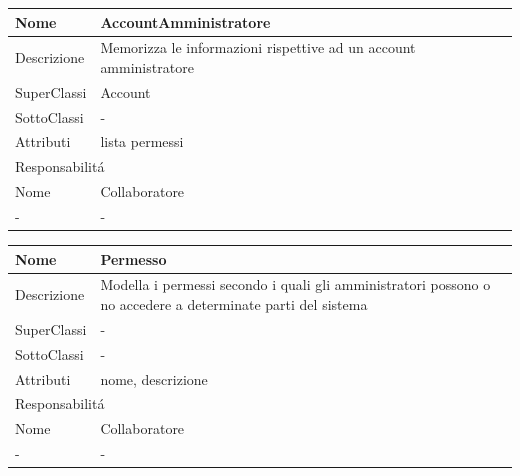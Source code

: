\begin{center} %
    \begin{longtable}{ |p{3cm}|p{3cm}|p{3cm}|p{3cm}| }
        \hline
        Nome & \multicolumn{3}{|p{9cm}|}{AccountAmministratore} \\\hline
        Descrizione & \multicolumn{3}{|p{9cm}|}{Memorizza le informazioni rispettive ad un account amministratore} \\\hline
        SuperClassi & \multicolumn{3}{|p{9cm}|}{Account} \\\hline
        SottoClassi & \multicolumn{3}{|p{9cm}|}{-} \\\hline
        Attributi & \multicolumn{3}{|p{9cm}|}{lista permessi} \\\hline
        \multicolumn{4}{|p{12cm}|}{Responsabilit\'a} \\\hline %
        \multicolumn{2}{|p{6cm}|}{Nome} & \multicolumn{2}{|p{6cm}|}{Collaboratore} \\\hline %
        \multicolumn{2}{|p{6cm}|}{-} & \multicolumn{2}{|p{6cm}|}{-} \\\hline
    \end{longtable}
\end{center}

\begin{center} %
    \begin{longtable}{ |p{3cm}|p{3cm}|p{3cm}|p{3cm}| }
        \hline
        Nome & \multicolumn{3}{|p{9cm}|}{Permesso} \\\hline
        Descrizione & \multicolumn{3}{|p{9cm}|}{Modella i permessi secondo i quali gli amministratori possono o no accedere a determinate parti del sistema} \\\hline
        SuperClassi & \multicolumn{3}{|p{9cm}|}{-} \\\hline
        SottoClassi & \multicolumn{3}{|p{9cm}|}{-} \\\hline
        Attributi & \multicolumn{3}{|p{9cm}|}{nome, descrizione} \\\hline
        \multicolumn{4}{|p{12cm}|}{Responsabilit\'a} \\\hline %
        \multicolumn{2}{|p{6cm}|}{Nome} & \multicolumn{2}{|p{6cm}|}{Collaboratore} \\\hline %
        \multicolumn{2}{|p{6cm}|}{-} & \multicolumn{2}{|p{6cm}|}{-} \\\hline
    \end{longtable}
\end{center}

